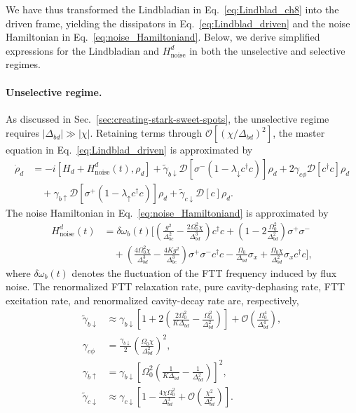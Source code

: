 We have thus transformed the Lindbladian in Eq.~\eqref{eq:Lindblad_ch8} into the driven frame, yielding the dissipators in Eq.~\eqref{eq:Lindblad_driven} and the noise Hamiltonian in Eq.~\eqref{eq:noise_Hamiltoniand}. Below, we derive simplified expressions for the Lindbladian and $H_{\mathrm{noise}}^d$ in both the unselective and selective regimes.

\paragraph{Unselective regime.}
As discussed in Sec.~\ref{sec:creating-stark-sweet-spots}, the unselective regime requires $|\Delta_{bd}| \gg |\chi|$. Retaining terms through $\mathcal{O}[(\chi/\Delta_{bd})^2]$, the master equation in Eq.~\eqref{eq:Lindblad_driven} is approximated by
\begin{align}
\label{unselectivemasterequation1}
\dot{\rho}_d
&= -i [H_d + H_{\mathrm{noise}}^d(t), \rho_d]
+ \widetilde{\gamma}_{b\downarrow} \mathcal{D}\!\left[ \sigma^- (1 - \lambda_\downarrow c^\dagger c) \right] \rho_d
+ 2\gamma_{c\phi} \mathcal{D}\!\left[ c^\dagger c \right] \rho_d \nonumber \\
&\quad
+ \gamma_{b\uparrow} \mathcal{D}\!\left[ \sigma^+ (1 - \lambda_\uparrow c^\dagger c) \right] \rho_d
+ \widetilde{\gamma}_{c\downarrow} \mathcal{D}[c] \rho_d .
\end{align} 
The noise Hamiltonian in Eq.~\eqref{eq:noise_Hamiltoniand} is approximated by
\begin{align}
\label{unselectivenoisehamiltonian}
H_{\mathrm{noise}}^d(t)
&= \delta\omega_b(t) \Bigg[
\left( \frac{g^2}{\Delta_{bc}^2} - \frac{2 \Omega_0^2 \chi}{\Delta_{bd}^3} \right)c^\dagger c
+ \left( 1 - 2 \frac{\Omega_0^2}{\Delta_{bd}^2} \right)\sigma^+ \sigma^- \nonumber \\
&\quad
+ \left( \frac{4 \Omega_0^2 \chi}{\Delta_{bd}^3}
- \frac{4 K g^2}{\Delta_{bc}^3} \right)
\sigma^+ \sigma^- c^\dagger c
- \frac{\Omega_0}{\Delta_{bd}} \sigma_x
+ \frac{\Omega_0 \chi}{\Delta_{bd}^2} \sigma_x c^\dagger c
\Bigg],
\end{align}
where $\delta\omega_b(t)$ denotes the fluctuation of the FTT frequency induced by flux noise. The renormalized FTT relaxation rate, pure cavity-dephasing rate, FTT excitation rate, and renormalized cavity-decay rate are, respectively,
\begin{align}
\widetilde{\gamma}_{b\downarrow}
&\approx \gamma_{b\downarrow}
\left[
1 + 2\left(
\frac{2\Omega_0^2}{K\Delta_{bd}}
- \frac{\Omega_0^2}{\Delta_{bd}^2}
\right)
\right]
+ \mathcal{O}\!\left(\frac{\Omega_0^4}{\Delta_{bd}^4}\right), \nonumber \\
\gamma_{c\phi}
&= \frac{\gamma_{b\downarrow}}{2}
\left( \frac{\Omega_0 \chi}{\Delta_{bd}^2} \right)^2, \nonumber \\
\gamma_{b\uparrow}
&= \gamma_{b\downarrow}
\left[
\Omega_0^2
\left(
\frac{1}{K\Delta_{bd}}
- \frac{1}{\Delta_{bd}^2}
\right)
\right]^2, \nonumber \\
\widetilde{\gamma}_{c\downarrow}
&\approx \gamma_{c\downarrow}
\left[
1 - \frac{4\chi \Omega_0^2}{\Delta_{bd}^3}
+ \mathcal{O}\!\left(\frac{\chi^2}{\Delta_{bd}^2}\right)
\right].
\end{align}
